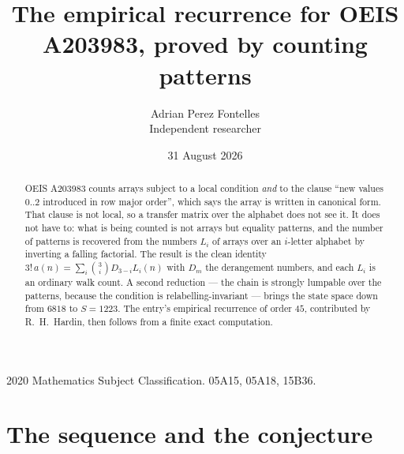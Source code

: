 \documentclass[11pt,a4paper]{article}
\title{The empirical recurrence for OEIS A203983, proved by counting patterns}
\author{Adrian Perez Fontelles\\ \small Independent researcher}
\date{31 August 2026}
\theoremstyle{plain}
\theoremstyle{definition}
\begin{document}
\maketitle

\begin{abstract}
OEIS A203983 counts arrays subject to a local condition \emph{and} to the clause ``new values
$0..2$ introduced in row major order'', which says the array is written in canonical
form. That clause is not local, so a transfer matrix over the alphabet does not see it. It
does not have to: what is being counted is not arrays but equality patterns, and the number
of patterns is recovered from the numbers $L_i$ of arrays over an $i$-letter alphabet by
inverting a falling factorial. The result is the clean identity
$3!\,a(n)=\sum_i\binom{3}{i}D_{3-i}L_i(n)$ with $D_m$ the derangement numbers,
and each $L_i$ is an ordinary walk count. A second reduction --- the chain is strongly
lumpable over the patterns, because the condition is relabelling-invariant --- brings the
state space down from $6818$ to $S=1223$. The entry's empirical recurrence of order
$45$, contributed by R.~H.~Hardin, then follows from a finite exact computation.
\end{abstract}

\noindent\small 2020 Mathematics Subject Classification. 05A15, 05A18, 15B36.\normalsize

\section{The sequence and the conjecture}
\end{document}
